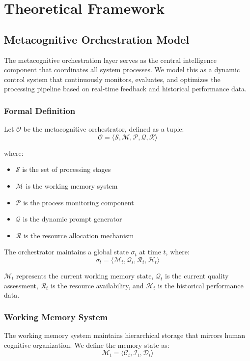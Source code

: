 \documentclass[12pt,a4paper]{article}
\begin{document}
\section{Theoretical Framework}

\subsection{Metacognitive Orchestration Model}

The metacognitive orchestration layer serves as the central intelligence component that coordinates all system processes. We model this as a dynamic control system that continuously monitors, evaluates, and optimizes the processing pipeline based on real-time feedback and historical performance data.

\subsubsection{Formal Definition}

Let $\mathcal{O}$ be the metacognitive orchestrator, defined as a tuple:
$$\mathcal{O} = \langle \mathcal{S}, \mathcal{M}, \mathcal{P}, \mathcal{Q}, \mathcal{R} \rangle$$

where:
\begin{itemize}
\item $\mathcal{S}$ is the set of processing stages
\item $\mathcal{M}$ is the working memory system
\item $\mathcal{P}$ is the process monitoring component
\item $\mathcal{Q}$ is the dynamic prompt generator
\item $\mathcal{R}$ is the resource allocation mechanism
\end{itemize}

The orchestrator maintains a global state $\sigma_t$ at time $t$, where:
$$\sigma_t = \langle \mathcal{M}_t, \mathcal{Q}_t, \mathcal{R}_t, \mathcal{H}_t \rangle$$

$\mathcal{M}_t$ represents the current working memory state, $\mathcal{Q}_t$ is the current quality assessment, $\mathcal{R}_t$ is the resource availability, and $\mathcal{H}_t$ is the historical performance data.

\subsubsection{Working Memory System}

The working memory system maintains hierarchical storage that mirrors human cognitive organization. We define the memory state as:
$$\mathcal{M}_t = \langle \mathcal{C}_t, \mathcal{I}_t, \mathcal{D}_t \rangle$$
\end{document}
